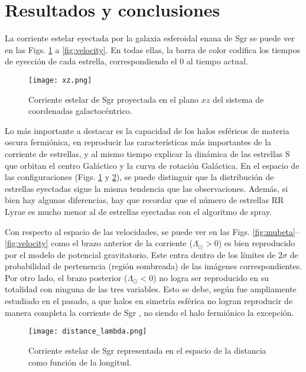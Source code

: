 \documentclass[baaa]{baaa}
\begin{document}
\section{Resultados y conclusiones}\label{sec:discusion_y_conclusiones}

La corriente estelar eyectada por la galaxia esferoidal enana de Sgr se puede ver en las Figs. \ref{fig:xz} a \ref{fig:velocity}. En todas ellas, la barra de color codifica los tiempos de eyección de cada estrella, correspondiendo el $0$ al tiempo actual.

\begin{figure}
    \centering
    \texttt{[image: xz.png]}
    \caption{Corriente estelar de Sgr proyectada en el plano $xz$ del sistema de coordenadas galactocéntrico.}
    \label{fig:xz}
\end{figure}

Lo más importante a destacar es la capacidad de los halos esféricos de materia oscura fermiónica, en reproducir las características más importantes de la corriente de estrellas, y al mismo tiempo explicar la dinámica de las estrellas S que orbitan el centro Galáctico y la curva de rotación Galáctica. En el espacio de las configuraciones (Figs. \ref{fig:xz} y \ref{fig:distance}), se puede distinguir que la distribución de estrellas eyectadas sigue la misma tendencia que las observaciones. Además, si bien hay algunas diferencias, hay que recordar que el número de estrellas RR Lyrae es mucho menor al de estrellas eyectadas con el algoritmo de spray.

Con respecto al espacio de las velocidades, se puede ver en las Figs. \ref{fig:mubeta}--\ref{fig:velocity} como el brazo anterior de la corriente ($\Lambda_{\odot} > 0$) es bien reproducido por el modelo de potencial gravitatorio. Este entra dentro de los límites de $2\sigma$ de probabilidad de pertenencia (región sombreada) de las imágenes correspondientes. Por otro lado, el brazo posterior ($\Lambda_{\odot} < 0$) no logra ser reproducido en su totalidad con ninguna de las tres variables. Esto se debe, según fue ampliamente estudiado en el pasado, a que halos en simetría esférica no logran reproducir de manera completa la corriente de Sgr  \citep{Helmi2004, Johnston2005, Law2010}, no siendo el halo fermiónico la excepción.

\begin{figure}
    \centering
    \texttt{[image: distance\_lambda.png]}
    \caption{Corriente estelar de Sgr representada en el espacio de la distancia como función de la longitud.}
    \label{fig:distance}
\end{figure}
\end{document}

